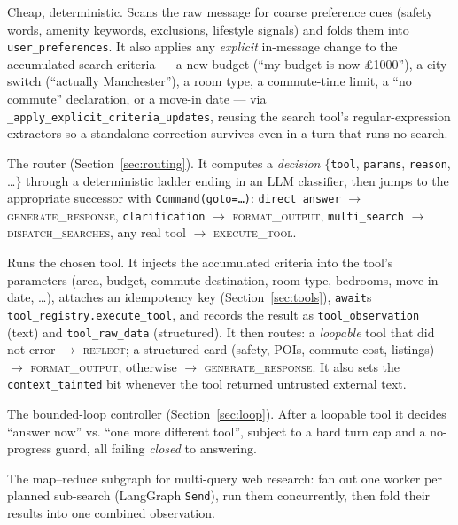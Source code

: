 \documentclass[11pt,a4paper]{article}
\newcommand{\code}[1]{\texttt{\small #1}}
\newcommand{\gnode}[1]{\textsc{#1}}  %
\begin{document}
\begin{description}[leftmargin=0pt,itemsep=3pt]
  \item[\gnode{extract\_preferences}.] Cheap, deterministic. Scans the raw message
  for coarse preference cues (safety words, amenity keywords, exclusions, lifestyle
  signals) and folds them into \code{user\_preferences}. It also applies any
  \emph{explicit} in-message change to the accumulated search criteria --- a new
  budget (``my budget is now \pounds1000''), a city switch (``actually
  Manchester''), a room type, a commute-time limit, a ``no commute'' declaration, or
  a move-in date --- via \code{\_apply\_explicit\_criteria\_updates}, reusing the
  search tool's regular-expression extractors so a standalone correction survives
  even in a turn that runs no search.

  \item[\gnode{decide\_tool}.] The router (Section~\ref{sec:routing}). It computes a
  \emph{decision} $\{$\code{tool}, \code{params}, \code{reason}, \dots$\}$ through a
  deterministic ladder ending in an LLM classifier, then jumps to the appropriate
  successor with \code{Command(goto=\dots)}: \code{direct\_answer} $\to$
  \gnode{generate\_response}, \code{clarification} $\to$ \gnode{format\_output},
  \code{multi\_search} $\to$ \gnode{dispatch\_searches}, any real tool $\to$
  \gnode{execute\_tool}.

  \item[\gnode{execute\_tool}.] Runs the chosen tool. It injects the accumulated
  criteria into the tool's parameters (area, budget, commute destination, room type,
  bedrooms, move-in date, \dots), attaches an idempotency key
  (Section~\ref{sec:tools}), \code{await}s \code{tool\_registry.execute\_tool}, and
  records the result as \code{tool\_observation} (text) and \code{tool\_raw\_data}
  (structured). It then routes: a \emph{loopable} tool that did not error $\to$
  \gnode{reflect}; a structured card (safety, POIs, commute cost, listings) $\to$
  \gnode{format\_output}; otherwise $\to$ \gnode{generate\_response}. It also sets the
  \code{context\_tainted} bit whenever the tool returned untrusted external text.

  \item[\gnode{reflect}.] The bounded-loop controller (Section~\ref{sec:loop}). After
  a loopable tool it decides ``answer now'' vs. ``one more different tool'', subject
  to a hard turn cap and a no-progress guard, all failing \emph{closed} to answering.

  \item[\gnode{dispatch\_searches} / \gnode{search\_worker} / \gnode{gather\_searches}.]
  The map--reduce subgraph for multi-query web research: fan out one worker per
  planned sub-search (LangGraph \code{Send}), run them concurrently, then fold their
  results into one combined observation.


\end{description}
\end{document}
